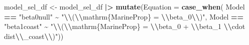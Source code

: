 \documentclass[
]{article}
\newenvironment{Shaded}{\begin{snugshade}}{\end{snugshade}}
\newcommand{\AttributeTok}[1]{\textcolor[rgb]{0.13,0.29,0.53}{#1}}
\newcommand{\FunctionTok}[1]{\textcolor[rgb]{0.13,0.29,0.53}{\textbf{#1}}}
\newcommand{\NormalTok}[1]{#1}
\newcommand{\OtherTok}[1]{\textcolor[rgb]{0.56,0.35,0.01}{#1}}
\newcommand{\SpecialCharTok}[1]{\textcolor[rgb]{0.81,0.36,0.00}{\textbf{#1}}}
\newcommand{\StringTok}[1]{\textcolor[rgb]{0.31,0.60,0.02}{#1}}
\begin{document}
\begin{Shaded}
\begin{Highlighting}[]
\NormalTok{model\_sel\_df }\OtherTok{\textless{}{-}}\NormalTok{ model\_sel\_df }\SpecialCharTok{|\textgreater{}} 
  \FunctionTok{mutate}\NormalTok{(}\AttributeTok{Equation =} \FunctionTok{case\_when}\NormalTok{(}
\NormalTok{    Model }\SpecialCharTok{==} \StringTok{"beta0null"} \SpecialCharTok{\textasciitilde{}} \StringTok{"}\SpecialCharTok{\textbackslash{}\textbackslash{}}\StringTok{(}\SpecialCharTok{\textbackslash{}\textbackslash{}}\StringTok{mathrm\{MarineProp\} = }\SpecialCharTok{\textbackslash{}\textbackslash{}}\StringTok{beta\_0}\SpecialCharTok{\textbackslash{}\textbackslash{}}\StringTok{)"}\NormalTok{,}
\NormalTok{    Model }\SpecialCharTok{==} \StringTok{"beta1coast"} \SpecialCharTok{\textasciitilde{}} \StringTok{"}\SpecialCharTok{\textbackslash{}\textbackslash{}}\StringTok{(}\SpecialCharTok{\textbackslash{}\textbackslash{}}\StringTok{mathrm\{MarineProp\} = }\SpecialCharTok{\textbackslash{}\textbackslash{}}\StringTok{beta\_0 + }\SpecialCharTok{\textbackslash{}\textbackslash{}}\StringTok{beta\_1 }\SpecialCharTok{\textbackslash{}\textbackslash{}}\StringTok{cdot dist}\SpecialCharTok{\textbackslash{}\textbackslash{}}\StringTok{\_coast}\SpecialCharTok{\textbackslash{}\textbackslash{}}\StringTok{)"}\NormalTok{))}


\end{Highlighting}
\end{Shaded}
\end{document}
